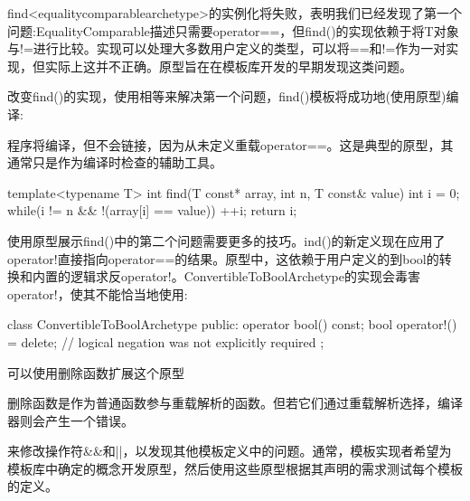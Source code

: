 find<equalitycomparablearchetype>的实例化将失败，表明我们已经发现了第一个问题:EqualityComparable描述只需要operator==，但find()的实现依赖于将T对象与!=进行比较。实现可以处理大多数用户定义的类型，可以将==和!=作为一对实现，但实际上这并不正确。原型旨在在模板库开发的早期发现这类问题。

改变find()的实现，使用相等来解决第一个问题，find()模板将成功地(使用原型)编译:

\begin{notice}程序将编译，但不会链接，因为从未定义重载operator==。这是典型的原型，其通常只是作为编译时检查的辅助工具。
\end{notice}

\begin{cpp}
template<typename T>
int find(T const* array, int n, T const& value) {
	int i = 0;
	while(i != n && !(array[i] == value))
		++i;
	return i;
}
\end{cpp}

使用原型展示find()中的第二个问题需要更多的技巧。ind()的新定义现在应用了operator!直接指向operator==的结果。原型中，这依赖于用户定义的到bool的转换和内置的逻辑求反operator!。ConvertibleToBoolArchetype的实现会毒害operator!，使其不能恰当地使用:

\begin{cpp}
class ConvertibleToBoolArchetype
{
	public:
	operator bool() const;
	bool operator!() = delete; // logical negation was not explicitly required
};
\end{cpp}

可以使用删除函数扩展这个原型

\begin{notice}删除函数是作为普通函数参与重载解析的函数。但若它们通过重载解析选择，编译器则会产生一个错误。
\end{notice}

来修改操作符\&\&和||，以发现其他模板定义中的问题。通常，模板实现者希望为模板库中确定的概念开发原型，然后使用这些原型根据其声明的需求测试每个模板的定义。






















